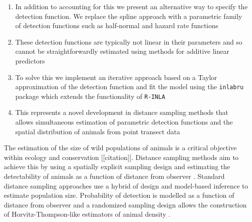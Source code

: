 \documentclass[preprint,12pt]{elsarticle}
\begin{document}
\begin{enumerate}
	\item In addition to accounting for this we present an alternative way to specify the detection function.  We replace the spline approach with a parametric family of detection functions such as half-normal and hazard rate functions
	\item  These detection functions are typically not linear in their parameters and so cannot be straightforwardly estimated using methods for additive linear predictors
	\item To solve this we implement an iterative approach based on a Taylor approximation of the detection function and fit the model using the \texttt{inlabru} package which extends the functionality of \texttt{R-INLA}
	\item This represents a novel development in distance sampling methods that allows simultaneous estimation of parametric detection functions and the spatial distribution of animals from point transect data
\end{enumerate}

The estimation of the size of wild populations of animals is a critical objective within ecology and conservation [[citation]].  Distance sampling methods aim to achieve this by using a spatially explicit sampling design and estimating the detectability of animals as a function of distance from observer \citep{buckland_advanced_2008, buckland_distance_2015}.  Standard distance sampling approaches use a hybrid of design and model-based inference to estimate population size.  Probability of detection is modelled as a function of distance from observer and a randomized sampling design allows the construction of Horvitz-Thompson-like estimators of animal density \citep{horvitz_generalization_1952,  buckland_advanced_2008}.
\end{document}
